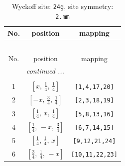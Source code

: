 \documentclass[fleqn,8pt]{jsarticle}
\begin{document}
\renewcommand{\arraystretch}{1.2}
\begin{longtable}{ccc}
\caption{Wyckoff site: {\tt 24g}, site symmetry: {\tt 2.mm}}
 \\
 \hline \hline
No. & position & mapping \\ \hline \endfirsthead

\multicolumn{2}{l}{\tablename\ \thetable{}} \\
 \hline \hline
No. & position & mapping \\ \hline \endhead

 \hline \hline
\multicolumn{2}{r}{\footnotesize\it continued ...} \\ \endfoot

 \hline \hline
\multicolumn{2}{r}{} \\ \endlastfoot

1 & $\left[ x,\, \frac{1}{4},\, \frac{1}{4} \right]$ & {\tt [1,4,17,20]} \\ \hline
2 & $\left[ - x,\, \frac{3}{4},\, \frac{1}{4} \right]$ & {\tt [2,3,18,19]} \\ \hline
3 & $\left[ \frac{1}{4},\, x,\, \frac{1}{4} \right]$ & {\tt [5,8,13,16]} \\ \hline
4 & $\left[ \frac{1}{4},\, - x,\, \frac{3}{4} \right]$ & {\tt [6,7,14,15]} \\ \hline
5 & $\left[ \frac{1}{4},\, \frac{1}{4},\, x \right]$ & {\tt [9,12,21,24]} \\ \hline
6 & $\left[ \frac{3}{4},\, \frac{1}{4},\, - x \right]$ & {\tt [10,11,22,23]} \\
\end{longtable}
\renewcommand{\arraystretch}{1.2}
\end{document}
